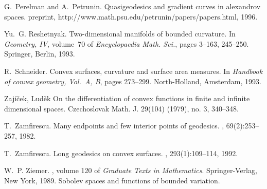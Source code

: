 \documentclass[12pt,leqno,intlimits]{amsart}
\numberwithin{equation}{section}
\theoremstyle{definition}
\theoremstyle{remark}
\begin{document}
\begin{thebibliography}{KMS01}
G.~Perelman and A.~Petrunin.
\newblock Quasigeodesics and gradient curves in alexandrov spaces.
\newblock preprint, http://www.math.psu.edu/petrunin/papers/papers.html, 1996.

Yu.~G. Reshetnyak.
\newblock Two-dimensional manifolds of bounded curvature.
\newblock In {\em Geometry, {IV}}, volume~70 of {\em Encyclopaedia Math. Sci.},
pages 3--163, 245--250. Springer, Berlin, 1993.

R.~Schneider.
\newblock Convex surfaces, curvature and surface area measures.
\newblock In {\em Handbook of convex geometry, {V}ol.\ {A}, {B}}, pages
273--299. North-Holland, Amsterdam, 1993.

Zaj\'i\v{c}ek, Lud\v{e}k
On the differentiation of convex functions in finite and infinite dimensional spaces.
Czechoslovak Math. J. 29(104) (1979), no. 3, 340--348.

T.~Zamfirescu.
\newblock Many endpoints and few interior points of geodesics.
, 69(2):253--257, 1982.

T.~Zamfirescu.
\newblock Long geodesics on convex surfaces.
, 293(1):109--114, 1992.

W.~P. Ziemer.
, volume 120 of {\em Graduate
Texts in Mathematics}.
\newblock Springer-Verlag, New York, 1989.
\newblock Sobolev spaces and functions of bounded variation.

\end{thebibliography}
\end{document}
